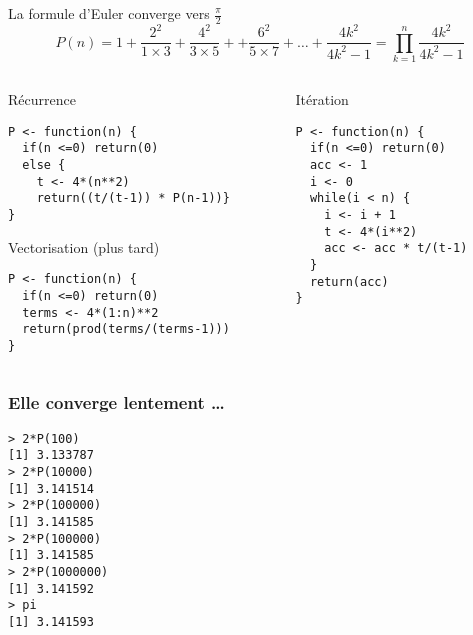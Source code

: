 \documentclass[10pt]{beamer}
\begin{document}
 \questionSlide

 \appendix
 \backupSlides

\begin{frame}[fragile]{La formule d'Euler converge vers $\frac{\pi}{2}$}
    $$
    P(n) = 1 + \frac{2^2}{1 \times 3} + \frac{4^2}{3 \times 5} + + \frac{6^2}{5 \times 7} + \ldots + \frac{4k^2}{4k^2-1}
    = \prod_{k=1}^n \frac{4k^2}{4k^2-1}
    $$
    \vspace{-10pt} 
    \begin{columns}[t]
      \begin{column}{0.53\textwidth}
  \begin{block}{Récurrence}
    \begin{lstlisting}[style=edblock]
P <- function(n) {      
  if(n <=0) return(0)
  else {
    t <- 4*(n**2)
    return((t/(t-1)) * P(n-1))}
}  
\end{lstlisting}
\end{block}
\begin{block}{Vectorisation (plus tard)}
    \begin{lstlisting}[style=edblock]
P <- function(n) {
  if(n <=0) return(0)
  terms <- 4*(1:n)**2
  return(prod(terms/(terms-1)))
}
\end{lstlisting}
  \end{block}

\end{column}
\begin{column}{0.47\textwidth}
  \begin{block}{Itération}
    \begin{lstlisting}[style=edblock]
P <- function(n) {      
  if(n <=0) return(0)
  acc <- 1
  i <- 0
  while(i < n) {
    i <- i + 1
    t <- 4*(i**2)
    acc <- acc * t/(t-1)
  }
  return(acc)
}  
\end{lstlisting}
  \end{block}
\end{column}
\end{columns}

\end{frame}


\begin{frame}[fragile]
  \frametitle{Elle converge lentement \dots}
  \begin{lstlisting}
> 2*P(100)
[1] 3.133787
> 2*P(10000)
[1] 3.141514
> 2*P(100000)
[1] 3.141585
> 2*P(100000)
[1] 3.141585
> 2*P(1000000)
[1] 3.141592
> pi
[1] 3.141593
\end{lstlisting}

\end{frame}



\end{document}
